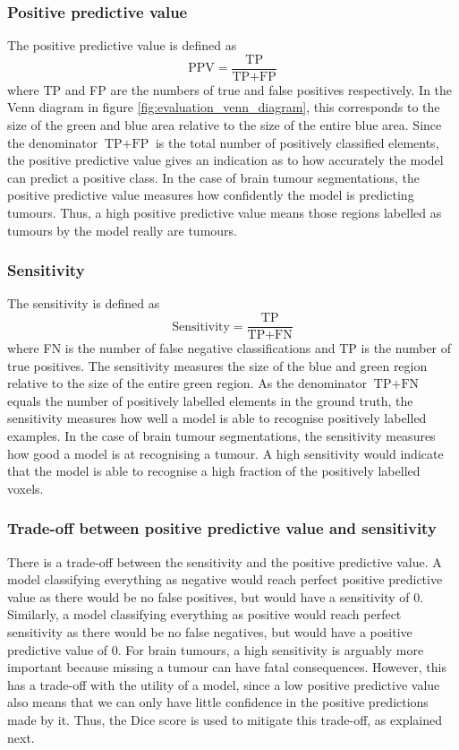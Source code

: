 \documentclass[12pt,a4paper,twoside,openright]{report}
\begin{document}
\subsubsection{Positive predictive value}
The positive predictive value is defined as
\begin{equation}
	\textrm{PPV} = \frac{\textrm{TP}}{\textrm{TP} + \textrm{FP}}
\end{equation}
where \textrm{TP} and \textrm{FP} are the numbers of true and false positives respectively. In the Venn diagram in figure \ref{fig:evaluation_venn_diagram}, this corresponds to the size of the green and blue area relative to the size of the entire blue area.  Since the denominator $\textrm{TP} + \textrm{FP}$ is the total number of positively classified elements, the positive predictive value gives an indication as to how accurately the model can predict a positive class. In the case of brain tumour segmentations, the positive predictive value measures how confidently the model is predicting tumours. Thus, a high positive predictive value means those regions labelled as tumours by the model really are tumours.

\subsubsection{Sensitivity}
The sensitivity is defined as 
\begin{equation}
	\textrm{Sensitivity} = \frac{\textrm{TP}}{\textrm{TP} + \textrm{FN}}
\end{equation}
where \textrm{FN} is the number of false negative classifications and \textrm{TP} is the number of true positives. The sensitivity measures the size of the blue and green region relative to the size of the entire green region. As the denominator $\textrm{TP} + \textrm{FN}$ equals the number of positively labelled elements in the ground truth, the sensitivity measures how well a model is able to recognise positively labelled examples. In the case of brain tumour segmentations, the sensitivity measures how good a model is at recognising a tumour. A high sensitivity would indicate that the model is able to recognise a high fraction of the positively labelled voxels.

\subsubsection{Trade-off between positive predictive value and sensitivity }
There is a trade-off between the sensitivity and the positive predictive value. A model classifying everything as negative would reach perfect positive predictive value as there would be no false positives, but would have a sensitivity of 0. Similarly, a model classifying everything as positive would reach perfect sensitivity as there would be no false negatives, but would have a positive predictive value of 0. For brain tumours, a high sensitivity is arguably more important because missing a tumour can have fatal consequences. However, this has a trade-off with the utility of a model, since a low positive predictive value also means that we can only have little confidence in the positive predictions made by it. Thus, the Dice score is used to mitigate this trade-off, as explained next.
\end{document}
